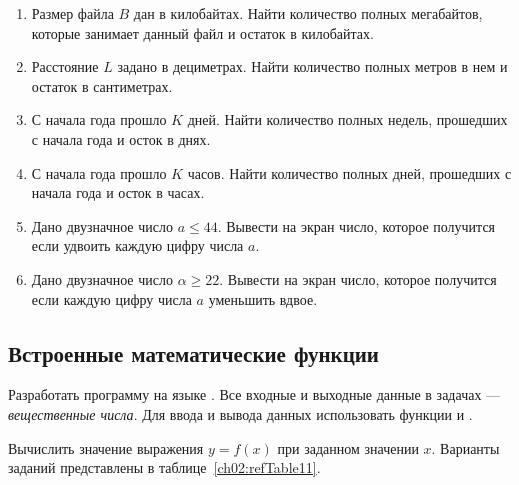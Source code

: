 \begin{enumerate}
\item Размер файла $B$ дан в килобайтах. Найти
количество полных мегабайтов, которые занимает данный файл и остаток в килобайтах.
\item Расстояние $L$ задано в дециметрах. Найти количество полных метров в нем и остаток в
сантиметрах.
\item С начала года прошло $K$ дней. Найти количество полных недель, прошедших с начала года и осток в
днях.
\item С начала года прошло $K$ часов. Найти количество полных дней, прошедших с начала года и осток в
часах.
\item Дано двузначное число $a\le 44$. Вывести на экран число, которое получится если удвоить каждую цифру
числа $a$.
\item Дано двузначное число $\alpha\ge 22$. Вывести на экран число, которое получится если каждую цифру числа
$a$ уменьшить вдвое.
\end{enumerate}

\subsection[Встроенные математические функции]{Встроенные математические функции}
Разработать программу на языке . Все входные и выходные данные в задачах --- \emph{вещественные числа}.
Для ввода и вывода данных использовать функции  и .

Вычислить значение выражения $y=f(x)$ при заданном значении
$x$. Варианты заданий представлены в таблице~\ref{ch02:refTable11}.

